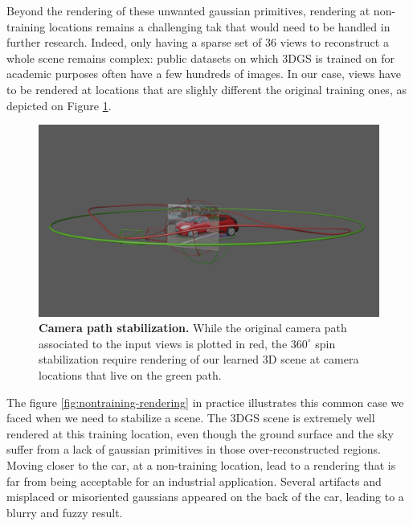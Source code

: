 Beyond the rendering of these unwanted gaussian primitives, rendering at non-training locations remains a challenging tak that would need to be handled in further research. Indeed, only having a sparse set of 36 views to reconstruct a whole scene remains complex: public datasets on which 3D\ac{GS} is trained on for academic purposes often have a few hundreds of images. In our case, views have to be rendered at locations that are slighly different the original training ones, as depicted on Figure \ref{fig:theory-camera-path}. 

\begin{figure}[htb!]
  \center
\includegraphics[width=\linewidth]{images/gaussiansplatting/theory-camera-path.png}
\caption{\textbf{Camera path stabilization.} While the original camera path associated to the input views is plotted in red, the $360^{\circ}$ spin stabilization require rendering of our learned 3D scene at camera locations that live on the green path.}
\label{fig:theory-camera-path}
\end{figure}

The figure \ref{fig:nontraining-rendering} in practice illustrates this common case we faced when we need to stabilize a scene. The 3D\ac{GS} scene is extremely well rendered at this training location, even though the ground surface and the sky suffer from a lack of gaussian primitives in those over-reconstructed regions. Moving closer to the car, at a non-training location, lead to a rendering that is far from being acceptable for an industrial application. Several artifacts and misplaced or misoriented gaussians appeared on the back of the car, leading to a blurry and fuzzy result. 

